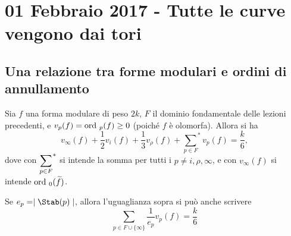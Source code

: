 \chapter{01 Febbraio 2017 - Tutte le curve vengono dai tori}

\section{Una relazione tra forme modulari e ordini di annullamento}

\begin{teorema}
	Sia $f$ una forma modulare di peso $2k$, $F$ il dominio fondamentale delle lezioni precedenti, e $v_p(f)=\text{ord }_p(f)\geq0$ (poiché $f$ è olomorfa). Allora si ha
	\begin{equation*}
	v_\infty(f)+\frac{1}{2}v_i(f)+\frac{1}{3}v_{\rho}(f)+{\sum_{p\in F}}^{*}v_p(f)=\frac{k}{6},
	\end{equation*}
	dove con $\displaystyle {\sum_{p\in F}}^{*}$ si intende la somma per tutti i $p \neq i, \rho, \infty$, e con $v_\infty(f)$ si intende $\text{ord }_0(\widetilde{f})$.
	
	Se $e_p=\abs{\Stab(p)}$, allora l'uguaglianza sopra si può anche scrivere
	\begin{equation*}
		\sum_{p\in F \cup \{\infty\}} \frac{1}{e_p}v_p(f)=\frac{k}{6}
	\end{equation*}
\end{teorema}

